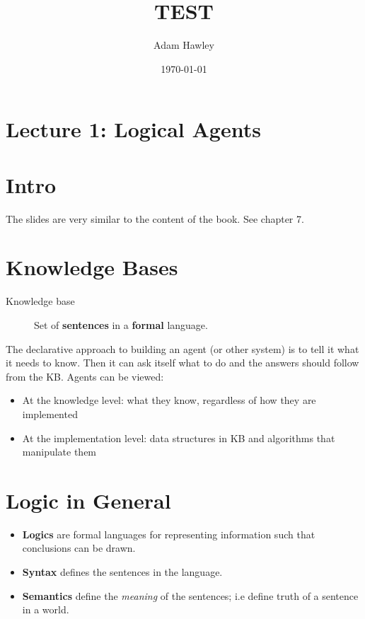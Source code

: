 \documentclass[11pt]{article}
\author{Adam Hawley}
\date{\today}
\title{TEST}
\begin{document}
\maketitle
\section{Lecture 1: Logical Agents}
\tableofcontents


\section{Intro}
\label{sec:org8ac8ab8}
The slides are very similar to the content of the book.
See chapter 7.

\section{Knowledge Bases}
\label{sec:org21b6bcd}
\begin{description}
\item[{Knowledge base}] Set of \textbf{sentences} in a \textbf{formal} language.
\end{description}
The declarative approach to building an agent (or other system) is to tell it what it needs to know.
Then it can ask itself what to do and the answers should follow from the KB.
Agents can be viewed:
\begin{itemize}
\item At the knowledge level: what they know, regardless of how they are implemented
\item At the implementation level: data structures in KB and algorithms that manipulate them
\end{itemize}

\section{Logic in General}
\label{sec:org687c359}
\begin{itemize}
\item \textbf{Logics} are formal languages for representing information such that conclusions can be drawn.
\item \textbf{Syntax} defines the sentences in the language.
\item \textbf{Semantics} define the \emph{meaning} of the sentences; i.e define truth of a sentence in a world.
\end{itemize}
\end{document}
